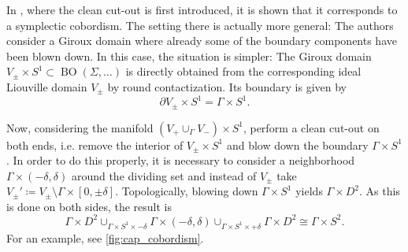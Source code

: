 In \cite[Section 6]{MNW13}, where the clean cut-out is first introduced,
it is shown that it corresponds to a symplectic cobordism.
The setting there is actually more general: The authors consider a Giroux
domain where already some of the boundary components have been blown down.
In this case, the situation is simpler: The Giroux domain 
$V_\pm \times S^1 \subset \operatorname{BO}(\Sigma, \dots)$
is directly obtained from the corresponding ideal Liouville domain $V_\pm$ by 
round contactization.
Its boundary is given by 
\[
    \partial V_\pm \times S^1 = \Gamma \times S^1.
\]

Now, considering the manifold $(V_+ \cup_\Gamma V_-)\times S^1$, perform a clean cut-out
on both ends, i.e. remove the interior of $V_\pm \times S^1$ and blow down the boundary $\Gamma \times S^1$.
In order to do this properly, it is necessary to consider a neighborhood 
$\Gamma \times (-\delta, \delta)$ around the dividing set and 
instead of $V_\pm$ take $V_\pm' \coloneqq V_\pm \setminus \Gamma \times [0, \pm \delta]$.
Topologically, blowing down $\Gamma \times S^1$ yields $\Gamma \times D^2$.
As this is done on both sides, the result is 
\[
    \Gamma \times D^2 \cup_{\Gamma \times S^1 \times -\delta} \Gamma \times (-\delta,\delta) 
    \cup_{\Gamma \times S^1 \times +\delta} \Gamma \times D^2 \cong \Gamma \times S^2.
\]
For an example, see \cref{fig:cap_cobordism}.


